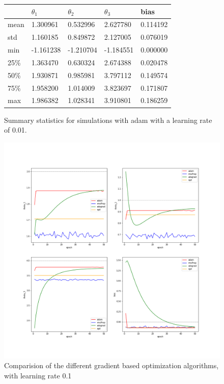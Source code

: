 \documentclass[aodsor,preprint]{imsart}
\numberwithin{equation}{section}
\theoremstyle{plain}
\begin{document}
\begin{figure}
\centering
\begin{tabular}{l|llll}
 &  $\theta_{1}$ &  $\theta_{2}$ &  $\theta_{3}$ & bias \\ \hline
mean  &  1.300961 & 0.532996 & 2.627780 & 0.114192\\
std   &  1.160185 & 0.849872 & 2.127005 & 0.076019\\
min   & -1.161238 & -1.210704 & -1.184551 & 0.000000\\
25\%   & 1.363470 &  0.630324 & 2.674388 & 0.020478\\
50\%   & 1.930871 &  0.985981 & 3.797112 & 0.149574\\
75\%   & 1.958200 &  1.014009 & 3.823697 & 0.171807\\
max   & 1.986382 &  1.028341 & 3.910801 & 0.186259\\
\end{tabular}
\caption{Summary statistics for simulations with adam with a learning rate of 0.01.}
\label{fig:sumstat1}
\end{figure}

\begin{figure}[htb]
\centering
\includegraphics[scale=	0.37]{images/comparison2.png}
\caption{Comparision of the different gradient based optimization algorithms, with learning rate 0.1}
\label{fig:simulation2}
\end{figure}
\end{document}
